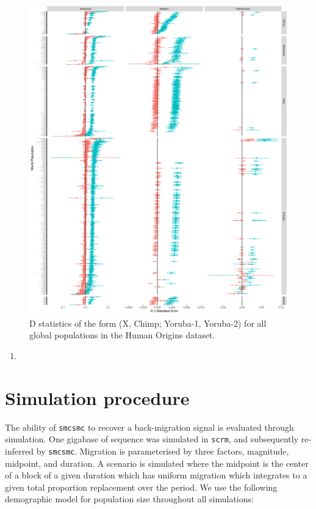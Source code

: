 \documentclass{article}
\begin{document}
\begin{figure}
	\centering
	\includegraphics[width=\textwidth]{../plot/yri_d_stats.pdf}
	\caption{D statistics of the form (X, Chimp; Yoruba-1, Yoruba-2) for all global populations in the Human Origins dataset.}
	\label{fig:alld}
\end{figure}


\begin{enumerate}
	\item 
\end{enumerate}

\section{Simulation procedure} \label{simproc}

The ability of {\tt smcsmc} to recover a back-migration signal is evaluated through simulation. One gigabase of sequence was simulated in {\tt scrm}, and subsequently re-inferred by {\tt smcsmc}. Migration is parameterised by three factors, magnitude, midpoint, and duration. A scenario is simulated where the midpoint is the center of a block of a given duration which has uniform migration which integrates to a given total proportion replacement over the period. We use the following demographic model for population size throughout all simulations:
\end{document}
